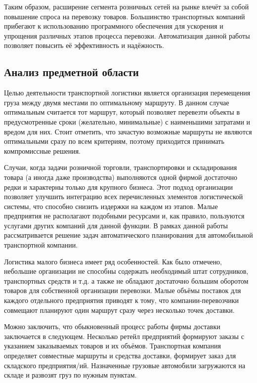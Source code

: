 	Таким образом, расширение сегмента розничных сетей на рынке влечёт за собой повышение спроса на перевозку товаров. Большинство транспортных компаний прибегают к использованию программного обеспечения для ускорения и упрощения различных этапов процесса перевозки\cite{subj:auto_eff}.  Автоматизация данной работы позволяет повысить её эффективность и надёжность.

\subsection{Анализ предметной области}
	Целью деятельности транспортной логистики является организация перемещения груза между двумя местами по оптимальному маршруту\cite{subj:main}. В данном случае оптимальным считается тот маршрут, который позволяет перевезти объекты в предусмотренные сроки (желательно, минимальные) с наименьшими затратами и вредом для них. Стоит отметить, что зачастую возможные маршруты не являются оптимальными сразу по всем критериям, поэтому приходится принимать компромиссные решения.
	
	Случаи, когда задачи розничной торговли, транспортировки и складирования товара (а иногда даже производства) выполняются одной фирмой достаточно редки и характерны только для крупного бизнеса. Этот подход организации позволяет улучшить интеграцию всех перечисленных элементов логистической системы, что способно снизить издержки на каждом из этапов. Малые предприятия не располагают подобными ресурсами и, как правило, пользуются услугами других компаний для данной функции. В рамках данной работы рассматривается решение задач автоматического планирования для автомобильной транспортной компании.
	
	Логистика малого бизнеса имеет ряд особенностей\cite{subj:small_business}. Как было отмечено, небольшие организации не способны содержать необходимый штат сотрудников, транспортных средств и т.д. а также не обладают достаточно большим оборотом товаров для собственной организации перевозки. Малые объёмы поставок для каждого отдельного предприятия приводят к тому, что компании-перевозчики совмещают планируют один маршрут сразу через несколько точек доставки.
	
	Можно заключить, что обыкновенный процесс работы фирмы доставки заключается в следующем. Несколько ретейл предприятий формируют заказы с указанием заказываемых товаров и их объёмов. Транспортная компания определяет совместные маршруты и средства доставки, формирует заказ для складского предприятия/ий. Назначенные грузовые автомобили загружаются на складе и развозят груз по нужным пунктам.

